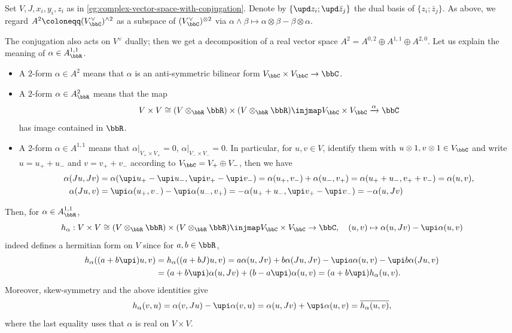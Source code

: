 \begin{example}[label=\labelNFM{eg:hermitian-form-and-11-form-on-a-complex-vs}, status=draft, tag=0000000]
	Set $V,J,x_i,y_i,z_i$ as in \cref{eg:complex-vector-space-with-conjugation}.
	Denote by $\{\upd z_i; \upd \bar{z}_j\}$ the dual basis of $\{z_i;\bar{z}_j\}$.
	As above, we regard $A^2 \coloneqq (V^\vee_\bbC)^{ \wedge 2}$ as a subspace of $(V^\vee_\bbC)^{ \otimes 2}$ via $\alpha \wedge \beta \mapsto \alpha \otimes \beta - \beta \otimes \alpha$.

	The conjugation also acts on $V^\vee$ dually; then we get a decomposition of a real vector space $A^2 = A^{0,2} \oplus A^{1,1} \oplus A^{2,0}$.
	Let us explain the meaning of $\alpha \in A^{1,1}_\bbR$.
	\begin{itemize}[nosep]
		\item A $2$-form $\alpha \in A^2$ means that $\alpha$ is an anti-symmetric bilinear form $V_\bbC \times V_\bbC \to \bbC$.
		\item A $2$-form $\alpha \in A^{2}_\bbR$ means that the map
		      \[ V \times V \cong (V \otimes _\bbR \bbR) \times (V \otimes _\bbR \bbR) \injmap V_\bbC \times V_\bbC \xrightarrow{\alpha} \bbC \]
		      has image contained in $\bbR$.
		\item A $2$-form $\alpha \in A^{1,1}$ means that $\alpha|_{V_+ \times V_+} = 0$, $\alpha|_{V_-\times V_-} = 0$.
		      In particular, for $u,v \in V$, identify them with $u \otimes 1,v \otimes 1 \in V_\bbC$ and write $u = u_+ + u_-$ and $v = v_+ + v_-$ according to $V_\bbC = V_+ \oplus V_-$,
		      then we have
              \begin{align*}
		      \alpha(Ju,Jv) & = \alpha(\upi u_+ - \upi u_-, \upi v_+ - \upi v_-) = \alpha(u_+,v_-) + \alpha(u_-,v_+) = \alpha(u_+ + u_-, v_+ + v_-) = \alpha(u,v),  \\
              \alpha(Ju,v) & = \upi \alpha(u_+,v_-) - \upi \alpha(u_-,v_+) = -\alpha(u_+ + u_-, \upi v_+ - \upi v_-) = -\alpha(u,Jv)
              \end{align*}
	\end{itemize}
	Then, for $\alpha \in A^{1,1}_\bbR$,
	\[ h_\alpha: V \times V \cong (V \otimes _\bbR \bbR) \times (V \otimes _\bbR \bbR) \injmap V_\bbC \times V_\bbC \to \bbC, \quad (u,v) \mapsto \alpha(u,Jv) - \upi \alpha(u,v) \]
	indeed defines a hermitian form on $V$ since for $a,b \in \bbR$,
	\begin{align*}
		h_{\alpha}((a + b\upi)u,v) & = h_{\alpha}((a + bJ)u,v) = a\alpha(u,Jv) + b\alpha(Ju,Jv) - \upi a\alpha(u,v) - \upi b\alpha(Ju,v) \\
		                           & = (a + b\upi)\alpha(u,Jv) + (b - a\upi)\alpha(u,v) = (a + b\upi)h_\alpha(u,v).
	\end{align*}
  Moreover, skew-symmetry and the above identities give
  \[	h_\alpha(v,u) = \alpha(v,Ju) - \upi\alpha(v,u) = \alpha(u,Jv) + \upi\alpha(u,v) = \overline{h_\alpha(u,v)}, \]
	where the last equality uses that $\alpha$ is real on $V \times V$.


\end{example}
